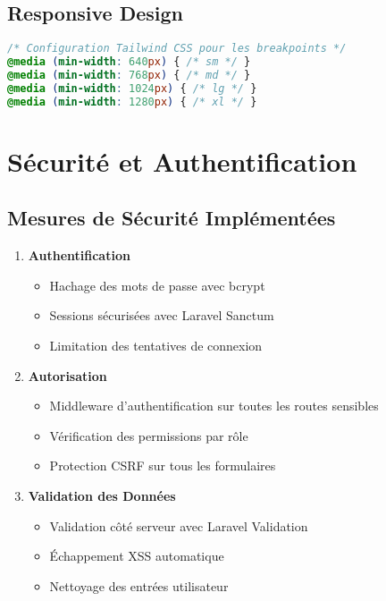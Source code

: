 \documentclass[12pt,a4paper]{report}
\begin{document}
\section{Responsive Design}
\begin{lstlisting}[language=CSS]
/* Configuration Tailwind CSS pour les breakpoints */
@media (min-width: 640px) { /* sm */ }
@media (min-width: 768px) { /* md */ }
@media (min-width: 1024px) { /* lg */ }
@media (min-width: 1280px) { /* xl */ }
\end{lstlisting}



















\chapter{Sécurité et Authentification}

\section{Mesures de Sécurité Implémentées}
\begin{enumerate}
    \item \textbf{Authentification}
    \begin{itemize}
        \item Hachage des mots de passe avec bcrypt
        \item Sessions sécurisées avec Laravel Sanctum
        \item Limitation des tentatives de connexion
    \end{itemize}
    \item \textbf{Autorisation}
    \begin{itemize}
        \item Middleware d'authentification sur toutes les routes sensibles
        \item Vérification des permissions par rôle
        \item Protection CSRF sur tous les formulaires
    \end{itemize}
    \item \textbf{Validation des Données}
    \begin{itemize}
        \item Validation côté serveur avec Laravel Validation
        \item Échappement XSS automatique
        \item Nettoyage des entrées utilisateur
    \end{itemize}
\end{enumerate}
\end{document}
